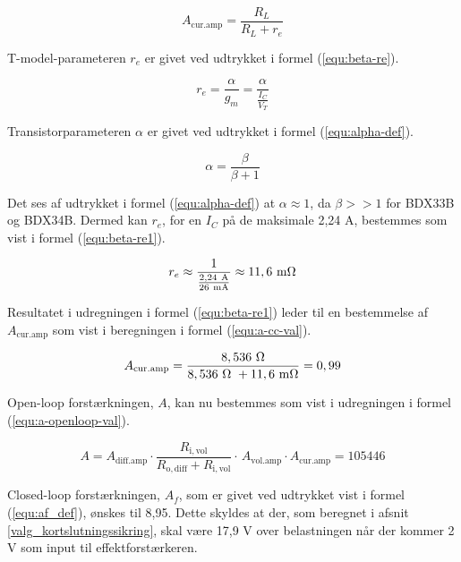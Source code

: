\begin{equation}
\label{equ:a-cc}
A_\mathrm{cur.amp} = \frac{R_L}{R_L+r_e}
\end{equation}

T-model-parameteren $r_e$ er givet ved udtrykket i formel (\ref{equ:beta-re}).

\begin{equation}
\label{equ:beta-re}
r_e = \frac{\alpha}{g_m} = \frac{\alpha}{\frac{I_C}{V_T}}
\end{equation}

Transistorparameteren $\alpha$ er givet ved udtrykket i formel (\ref{equ:alpha-def}).

\begin{equation}
\label{equ:alpha-def}
\alpha = \frac{\beta}{\beta + 1}
\end{equation}

Det ses af udtrykket i formel (\ref{equ:alpha-def}) at $\alpha \approx 1$, da $\beta>>1$ for BDX33B og BDX34B. Dermed kan $r_e$, for en $I_C$ på de maksimale 2,24 A, bestemmes som vist i formel (\ref{equ:beta-re1}).

\begin{equation}
\label{equ:beta-re1}
r_e \approx \frac{1}{\frac{\mathrm{2,24~A}}{\mathrm{26~mA}}} \approx \mathrm{11,6~m\ohm}
\end{equation}

Resultatet i udregningen i formel (\ref{equ:beta-re1}) leder til en bestemmelse af $A_\mathrm{cur.amp}$ som vist i beregningen i formel (\ref{equ:a-cc-val}).

\begin{equation}
\label{equ:a-cc-val}
A_\mathrm{cur.amp} = \frac{\mathrm{8,536~\ohm}}{\mathrm{8,536~\ohm~} + \mathrm{11,6~m\ohm}} = 0,99
\end{equation}

Open-loop forstærkningen, $A$, kan nu bestemmes som vist i udregningen i formel (\ref{equ:a-openloop-val}).

\begin{equation}
\label{equ:a-openloop-val}
A = A_\mathrm{diff.amp} \cdot \frac{R_\mathrm{i,vol}}{R_\mathrm{o,diff} + R_\mathrm{i,vol}} \cdot \frac{}{} A_\mathrm{vol.amp} \cdot A_\mathrm{cur.amp} = 105446
\end{equation}

Closed-loop forstærkningen, $A_f$, som er givet ved udtrykket vist i formel (\ref{equ:af_def}), ønskes til 8,95. Dette skyldes at der, som beregnet i afsnit \ref{valg_kortslutningssikring}, skal være 17,9 V over belastningen når der kommer 2 V som input til effektforstærkeren.

